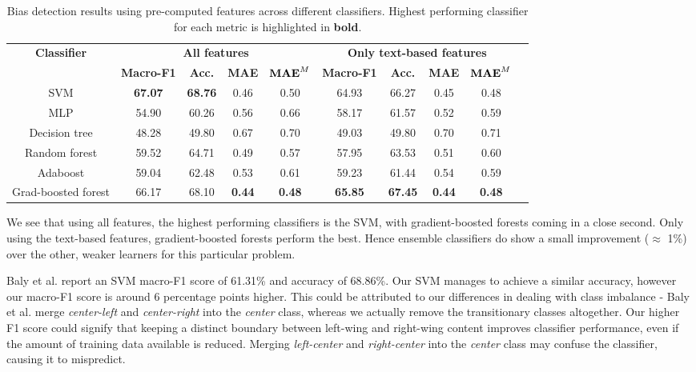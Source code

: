 \begin{table}[h]
    \centering
    \small
    \begin{adjustbox}{width=1.1\textwidth,center}
    \begin{tabular}{|c|c|c|c|c|c|c|c|c|c|}
        \hline
        \textbf{Classifier} & \multicolumn{4}{|c}{\textbf{All features}} & \multicolumn{4}{|c|}{\textbf{Only text-based features}} \\
        \cline{2-9}
         & \textbf{Macro-F1} & \textbf{Acc.} & \textbf{MAE} & $ \textrm{\textbf{MAE}}^M $ & \textbf{Macro-F1} & \textbf{Acc.} & \textbf{MAE} & $ \textrm{\textbf{MAE}}^M $ \\
         \hline
         SVM & \textbf{67.07} & \textbf{68.76} & 0.46 & 0.50 & 64.93 & 66.27 & 0.45 & 0.48  \\
         MLP & 54.90 & 60.26 & 0.56 & 0.66 & 58.17 & 61.57 & 0.52 & 0.59 \\
         Decision tree & 48.28 & 49.80 & 0.67 & 0.70 & 49.03 & 49.80 & 0.70 & 0.71 \\
         \hline
         Random forest & 59.52 & 64.71 & 0.49 & 0.57 & 57.95 & 63.53 & 0.51 & 0.60 \\
         Adaboost & 59.04 & 62.48 & 0.53 & 0.61 & 59.23 & 61.44 & 0.54 & 0.59 \\
         Grad-boosted forest & 66.17 & 68.10 & \textbf{0.44} & \textbf{0.48} & \textbf{65.85} & \textbf{67.45} & \textbf{0.44} & \textbf{0.48} \\
         \hline
    \end{tabular}
    \end{adjustbox}
    \caption{Bias detection results using pre-computed features across different classifiers. Highest performing classifier for each metric is highlighted in \textbf{bold}.}
    \label{tab:nmr-ensemble-results}
\end{table}

We see that using all features, the highest performing classifiers is the SVM, with gradient-boosted forests coming in a close second. Only using the text-based features, gradient-boosted forests perform the best. Hence ensemble classifiers do show a small improvement ($ \approx $ 1\%) over the other, weaker learners for this particular problem.


Baly et al. report an SVM macro-F1 score of 61.31\% and accuracy of 68.86\%. Our SVM manages to achieve a similar accuracy, however our macro-F1 score is around 6 percentage points higher. This could be attributed to our differences in dealing with class imbalance - Baly et al. merge \textit{center-left} and \textit{center-right} into the \textit{center} class, whereas we actually remove the transitionary classes altogether. Our higher F1 score could signify that keeping a distinct boundary between left-wing and right-wing content improves classifier performance, even if the amount of training data available is reduced. Merging \textit{left-center} and \textit{right-center} into the \textit{center} class may confuse the classifier, causing it to mispredict.

